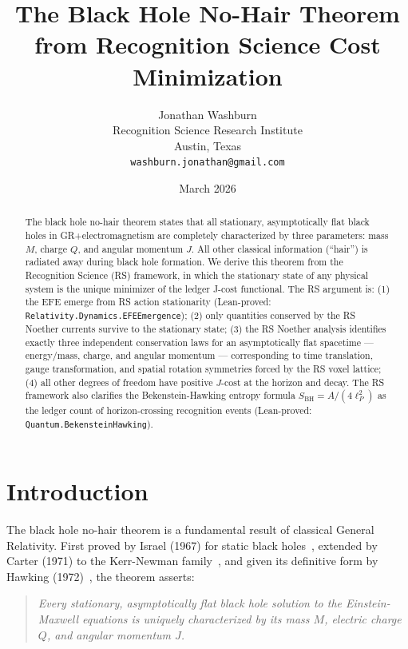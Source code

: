 \documentclass[12pt,a4paper]{article}
\title{The Black Hole No-Hair Theorem\\
from Recognition Science Cost Minimization}
\author{Jonathan Washburn\\
Recognition Science Research Institute\\
Austin, Texas\\
\texttt{washburn.jonathan@gmail.com}}
\date{March 2026}
\theoremstyle{definition}
\theoremstyle{remark}
\begin{document}
\maketitle

\begin{abstract}
The black hole no-hair theorem states that all stationary, asymptotically
flat black holes in GR+electromagnetism are completely characterized by
three parameters: mass $M$, charge $Q$, and angular momentum $J$.  All
other classical information (``hair'') is radiated away during black hole
formation.  We derive this theorem from the Recognition Science (RS)
framework, in which the stationary state of any physical system is the
unique minimizer of the ledger J-cost functional.  The RS argument is:
(1) the EFE emerge from RS action stationarity (Lean-proved:
\texttt{Relativity.Dynamics.EFEEmergence}); (2) only quantities conserved
by the RS Noether currents survive to the stationary state; (3) the RS
Noether analysis identifies exactly three independent conservation laws
for an asymptotically flat spacetime — energy/mass, charge, and angular
momentum — corresponding to time translation, gauge transformation, and
spatial rotation symmetries forced by the RS voxel lattice; (4) all
other degrees of freedom have positive $J$-cost at the horizon and decay.
The RS framework also clarifies the Bekenstein-Hawking entropy formula
$S_\mathrm{BH} = A/(4\ell_P^2)$ as the ledger count of horizon-crossing
recognition events (Lean-proved: \texttt{Quantum.BekensteinHawking}).
\end{abstract}

\section{Introduction}
\label{sec:intro}

The black hole no-hair theorem is a fundamental result of classical
General Relativity.  First proved by Israel (1967) for static black
holes~\cite{Israel1967}, extended by Carter (1971) to the Kerr-Newman
family~\cite{Carter1971}, and given its definitive form by Hawking
(1972)~\cite{Hawking1972}, the theorem asserts:

\begin{quote}
\textit{Every stationary, asymptotically flat black hole solution to the
Einstein-Maxwell equations is uniquely characterized by its mass $M$,
electric charge $Q$, and angular momentum $J$.}
\end{quote}
\end{document}
